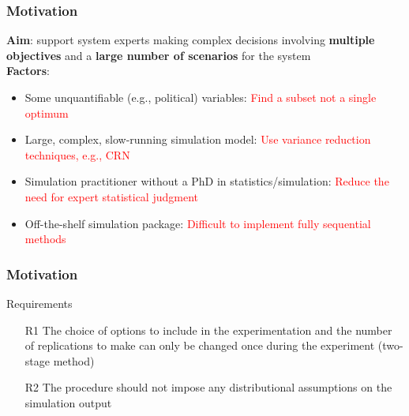 \documentclass[aspectratio=169]{beamer}
\begin{document}

\begin{frame}
\frametitle{Motivation}
\textbf{Aim}: support system experts making complex decisions involving \textbf{multiple objectives} and a \textbf{large number of scenarios} for the system\\
\textbf{Factors}:
\begin{itemize}
\item Some unquantifiable (e.g., political) variables:   \textcolor{red}{Find a subset not a single optimum}
\item Large, complex, slow-running simulation model:  \textcolor{red}{Use variance reduction techniques, e.g., CRN}
\item Simulation practitioner without a PhD in statistics/simulation: \textcolor{red}{Reduce the need for expert statistical judgment}
\item Off-the-shelf simulation package:  \textcolor{red}{Difficult to implement fully sequential methods}
\end{itemize}
\end{frame}




\begin{frame}
\frametitle{Motivation}
\begin{block}{Requirements}
\begin{itemize}
\item[R1] The choice of options to include in the experimentation and the number of replications to make can only be changed once during the experiment (two-stage method)
\item[R2]The procedure should not impose any distributional assumptions on the simulation output

\end{itemize}
\end{block}

\end{frame}
\end{document}
